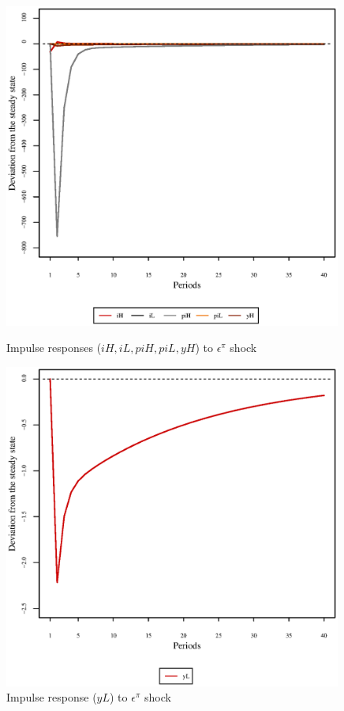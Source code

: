 \begin{figure}[h]
\begin{minipage}{0.5\textwidth}
\vspace*{-3em}
\centering
\includegraphics[width=0.99\textwidth, scale=0.55]{plots/plot_7.eps}
\caption{Impulse responses (${i\!H}, {i\!L}, {p\!i\!H}, {p\!i\!L}, {y\!H}$) to $\epsilon^{\pi}$ shock}
\end{minipage}
\begin{minipage}{0.5\textwidth}
\vspace*{-3em}
\centering
\includegraphics[width=0.99\textwidth, scale=0.55]{plots/plot_8.eps}
\caption{Impulse response (${y\!L}$) to $\epsilon^{\pi}$ shock}
\end{minipage}
\end{figure}


